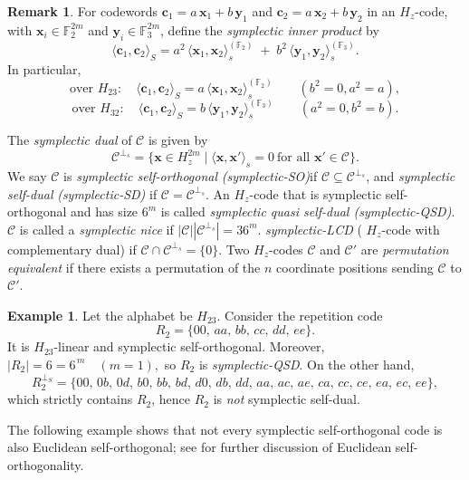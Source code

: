 \documentclass[11pt,a4paper]{article}
\theoremstyle{definition}
\newtheorem{example}[theorem]{Example}
\newtheorem{remark}[theorem]{Remark}
\numberwithin{equation}{section}
\def\x{{\mathbf x}}
\newcommand{\F}{\mathbb{F}}
\def\C{{\mathcal{C}}}
\def\H{{\mathit{H}}}
\begin{document}
\begin{remark}\label{rem}
For codewords \(\mathbf{c}_1=a\,\mathbf{x}_1+b\,\mathbf{y}_1\) and \(\mathbf{c}_2=a\,\mathbf{x}_2+b\,\mathbf{y}_2\) in an \(H_z\)-code, with
\(\mathbf{x}_i\in\F_2^{2m}\) and \(\mathbf{y}_i\in\F_3^{2m}\), define the \emph {symplectic inner product} by
\begin{equation}
	\langle \mathbf{c}_1,\mathbf{c}_2\rangle_S
= a^2\,\langle \mathbf{x}_1,\mathbf{x}_2\rangle_s^{(\F_2)}
\;+\;
b^2\,\langle \mathbf{y}_1,\mathbf{y}_2\rangle_s^{(\F_3)}.
\end{equation}
 In particular,
\[
\text{over }H_{23}:\quad \langle \mathbf{c}_1,\mathbf{c}_2\rangle_S
= a\,\langle \mathbf{x}_1,\mathbf{x}_2\rangle_s^{(\F_2)}
\qquad(b^2=0,a^2=a),
\]
\[
\text{over }H_{32}:\quad \langle \mathbf{c}_1,\mathbf{c}_2\rangle_S
= b\,\langle \mathbf{y}_1,\mathbf{y}_2\rangle_s^{(\F_3)}
\qquad(a^2=0,b^2=b).
\]
\end{remark}

The \emph{symplectic dual} of \(\C\) is given by
	\[
	\C^{\perp_s} = \{ \x\in \H_z^{2m} \mid \langle \x,\x'\rangle_s = 0\ \text{for all } \x'\in \C\}.
	\]
	We say \(\C\) is \emph{symplectic self-orthogonal} \emph{(symplectic-SO)}if \(\C \subseteq \C^{\perp_s}\), and \emph{symplectic self-dual} \emph{(symplectic-SD)} if \(\C = \C^{\perp_s}\). An $\H_z$-code that is symplectic self-orthogonal and has size \(6^m\) is called \emph{symplectic quasi self-dual (symplectic-QSD)}. $\C$ is called a \emph{ symplectic nice} if $|\C||\C^{\perp_s}|=36^m$. \emph{symplectic-LCD} ( $\H_z$-code with complementary dual) if \(\C\cap \C^{\perp_s}=\{0\}\). Two  $\H_z$-codes \(\C\) and \(\C'\) are \emph{permutation equivalent} if there exists a permutation of the \(n\) coordinate positions sending \(\C\) to \(\C'\). 


	\begin{example}
Let the alphabet be $H_{23}$. Consider the repetition code 
\[
R_2 = \{00,\,aa,\,bb,\,cc,\,dd,\,ee\}.
\]
It is $H_{23}$-linear and symplectic self-orthogonal. Moreover, $|R_2|=6=6^{\,m}\quad(m=1),$
so $R_2$ is \emph{symplectic-QSD}. On the other hand,
\[
R_2^{\perp_S}=\{00,\,0b,\,0d,\,b0,\,bb,\,bd,\,d0,\,db,\,dd,\,
aa,\,ac,\,ae,\,ca,\,cc,\,ce,\,ea,\,ec,\,ee\},
\]
which strictly contains $R_2$, hence $R_2$ is \emph{not} symplectic self-dual.
\end{example}

\noindent
The following example shows that not every symplectic self-orthogonal code is also Euclidean self-orthogonal; see \cite{AAABBSS} for further discussion of Euclidean self-orthogonality.
\end{document}

